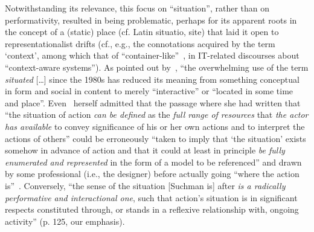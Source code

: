 \documentclass{article}
\begin{document}
Notwithstanding its relevance, this focus on ``situation'', rather than on performativity, resulted in being problematic, perhaps for its apparent roots in the concept of a (static) place (cf. Latin situatio, site) that laid it open to representationalist drifts (cf., e.g., the connotations acquired by the term `context', among which that of ``container-like''~\citep[p. 19 ]{suchman_human-machine_2006}, in IT-related discourses about ``context-aware systems''). As pointed out by~\citet[p. 23]{clancey_situated_1997}, ``the overwhelming use of the term \emph{situated} [\ldots] since the 1980s has reduced its meaning from something conceptual in form and social in content to merely ``interactive'' or ``located in some time and place''. Even~\citet{suchman_human-machine_2006} herself admitted that the passage where she had written that ``the situation of action \emph{can be defined} as the \emph{full range of resources} that \emph{the actor has available} to convey significance of his or her own actions and to interpret the actions of others'' could be erroneously ``taken to imply that `the situation' exists somehow in advance of action and that it could at least in principle \emph{be fully enumerated and represented} in the form of a model to be referenced'' and drawn by some professional (i.e., the designer) before actually going ``where the action is''~\citep{dourish_where_2001}. Conversely, ``the sense of the situation [Suchman is] after \emph{is a radically performative and interactional one}, such that action's situation is in significant respects constituted through, or stands in a reflexive relationship with, ongoing activity'' (p. 125, our emphasis).  
\end{document}
